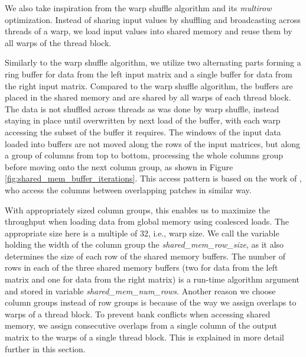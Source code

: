 We also take inspiration from the warp shuffle algorithm and its \textit{multirow} optimization. Instead of sharing input values by shuffling and broadcasting across threads of a warp, we load input values into shared memory and reuse them by all warps of the thread block.

Similarly to the warp shuffle algorithm, we utilize two alternating parts forming a ring buffer for data from the left input matrix and a single buffer for data from the right input matrix. Compared to the warp shuffle algorithm, the buffers are placed in the shared memory and are shared by all warps of each thread block. The data is not shuffled across threads as was done by warp shuffle, instead staying in place until overwritten by next load of the buffer, with each warp accessing the subset of the buffer it requires. The windows of the input data loaded into buffers are not moved along the rows of the input matrices, but along a group of columns from top to bottom, processing the whole columns group before moving onto the next column group, as shown in Figure \ref{fig:shared_mem_buffer_iterations}. This access pattern is based on the work of \citet{paper:krulis_3d_block}, who access the columns between overlapping patches in similar way.


With appropriately sized column groups, this enables us to maximize the throughput when loading data from global memory using coalesced loads. The appropriate size here is a multiple of 32, i.e., warp size.  We call the variable holding the width of the column group the \textit{shared\_mem\_row\_size}, as it also determines the size of each row of the shared memory buffers. The number of rows in each of the three shared memory buffers (two for data from the left matrix and one for data from the right matrix) is a run-time algorithm argument and stored in variable \textit{shared\_mem\_num\_rows}.
Another reason we choose column groups instead of row groups is because of the way we assign overlaps to warps of a thread block. To prevent bank conflicts when accessing shared memory, we assign consecutive overlaps from a single column of the output matrix to the warps of a single thread block. This is explained in more detail further in this section.


